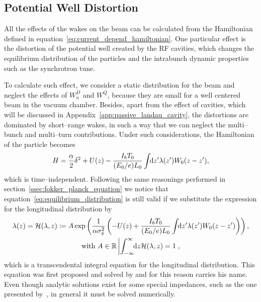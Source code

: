 \subsection{Potential Well Distortion}

    All the effects of the wakes on the beam can be calculated from the Hamiltonian defined in equation~\eqref{eq:current_depend_hamiltonian}. One particular effect is the distortion of the potential well created by the RF cavities, which changes the equilibrium distribution of the particles and the intrabunch dynamic properties such as the synchrotron tune.

    To calculate such effect, we consider a static distribution for the beam and neglect the effects of $W^D_u$ and $W^Q$, because they are small for a well centered beam in the vacuum chamber. Besides, apart from the effect of cavities, which will be discussed in Appendix~\ref{app:passive_landau_cavity}, the distortions are dominated by short--range wakes, in such a way that we can neglect the multi--bunch and multi--turn contributions. Under such considerations, the Hamiltonian of the particle becomes
    \begin{align}
        H = \frac\alpha2\delta^2 + U(z) -
            \frac{I_bT_0}{(E_0/e)L_0}\int\!\!\text{d}z' \lambda(z') W_0(z-z'),
    \end{align}
    which is time--independent. Following the same reasonings performed in section~\ref{ssec:fokker_planck_equation} we notice that equation~\eqref{eq:equilibrium_distribution} is still valid if we substitute the expression for the longitudinal distribution by
    \begin{gather}\label{eq:haissinski_equation}
        \lambda(z) = \mathcal{H}(\lambda,z) \coloneqq A\exp\left(\frac{1}{\alpha\sigma_\delta^2}\left(
            -U(z) + \frac{I_bT_0}{(E_0/e)L_0}\int\!\!\text{d}z' \lambda(z') W_0(z-z')\right)\right),\\\nonumber
            \text{with}\,\,A \in \mathbb{R} \left| \int_{-\infty}^{\infty}\!\!\text{d}z \mathcal{H}(\lambda,z)=1\right.,
    \end{gather}
    which is a transcendental integral equation for the longitudinal distribution. This equation was first proposed and solved by  and for this reason carries his name. Even though analytic solutions exist for some special impedances, such as the one presented by~, in general it must be solved numerically.

